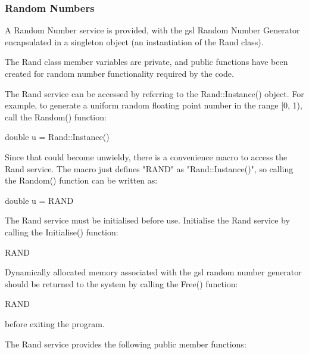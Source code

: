 \subsubsection{Random Numbers}\label{sec:Services_RAND}

A Random Number service is provided, with the gsl Random Number Generator encapsulated in a singleton object (an instantiation of the Rand class).  

The Rand class member variables are private, and public functions have been created for random number functionality required by the code.

The Rand service can be accessed by referring to the Rand::Instance() object.  For example, to generate a uniform random floating point number in the range [0, 1), call the Random() function:

\tabto{3em}double u = Rand::Instance()

\medskip
Since that could become unwieldy, there is a convenience macro to access the Rand service.  The macro just defines "RAND" as "Rand::Instance()", so calling the Random() function can be written as:

\tabto{3em}double u = RAND

\medskip
The Rand service must be initialised before use.  Initialise the Rand service by calling the Initialise() function:

\tabto{3em}RAND

\medskip
Dynamically allocated memory associated with the gsl random number generator should be returned to the system by calling the Free() function:

\tabto{3em}RAND

before exiting the program.

\bigskip
The Rand service provides the following public member functions:

